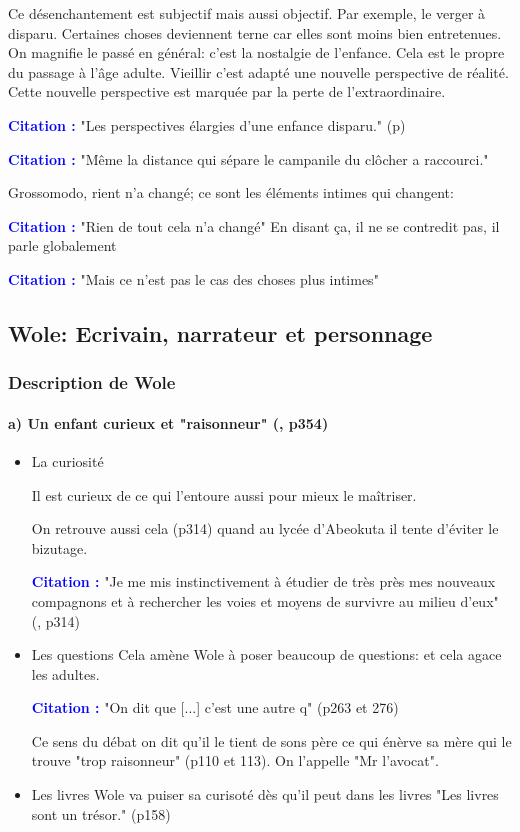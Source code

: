 \documentclass[a4paper, 11pt, hidelinks]{article}
\newcommand{\bs}{\bigskip}
\newcommand{\cit}{\large \textcolor{blue}{\textbf{Citation :}} \large }
\newcommand{\rb}[1]{\Romanbar{#1}}
\begin{document}
\bs

Ce désenchantement est subjectif mais aussi objectif. Par exemple, le verger à disparu. Certaines choses deviennent terne car elles sont
moins bien entretenues. On magnifie le passé en général: c'est la nostalgie de l'enfance. Cela est le propre du passage
à l'âge adulte. Vieillir c'est adapté une nouvelle perspective de réalité. Cette nouvelle perspective est marquée par la perte de l'extraordinaire.


\cit "Les perspectives élargies d'une enfance disparu." (p)

\cit "Même la distance qui sépare le campanile du clôcher a raccourci."


Grossomodo, rient n'a changé; ce sont les éléments intimes qui changent:


\cit "Rien de tout cela n'a changé" En disant ça, il ne se contredit pas, il parle globalement


\cit "Mais ce n'est pas le cas des choses plus intimes"







\subsection{Wole: Ecrivain, narrateur et personnage}
\subsubsection{Description de Wole}


\paragraph{a) Un enfant curieux et "raisonneur" (\rb{13}, p354)}


\begin{itemize}
    \item La curiosité
    
    Il est curieux de ce qui l'entoure aussi pour mieux le maîtriser.
    
    On retrouve aussi cela (p314) quand au lycée d'Abeokuta il tente d'éviter le bizutage.

    \cit "Je me mis instinctivement à étudier de très près mes nouveaux compagnons et à rechercher les voies et moyens de survivre au milieu d'eux" (\rb{12}, p314)
    \item Les questions
    Cela amène Wole à poser beaucoup de questions: et cela agace les adultes.

    \cit "On dit que [...] c'est une autre q" (p263 et 276)

    Ce sens du débat on dit qu'il le tient de sons père ce qui énèrve sa mère qui le trouve "trop raisonneur" (p110 et 113). On l'appelle "Mr l'avocat".

    \item Les livres
    Wole va puiser sa curisoté dès qu'il peut dans les livres "Les livres sont un trésor." (p158)
\end{itemize}
\end{document}
